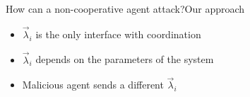\documentclass[aspectratio=169]{beamer}
\begin{document}
\begin{frame}{How can a non-cooperative agent attack?}{Our approach}
  \begin{overlayarea}{\textwidth}{.2\textwidth}
    \begin{minipage}[t]{.6\linewidth}
      \begin{itemize}
        \item<1-> $\vec{\lambda}_{i}$ is the only interface with coordination
        \item<2-> $\vec{\lambda}_{i}$ depends on the parameters of the system
        \item<3-> Malicious agent sends a different $\vec{\lambda}_{i}$
      \end{itemize}
      \centering
    \end{minipage}
    \hfill
    \begin{minipage}[t]{.3\linewidth}
      \begin{figure}
        \centering
      \end{figure}
    \end{minipage}
  \end{overlayarea}
\end{frame}
\end{document}
